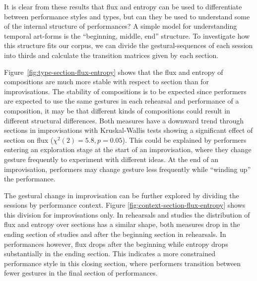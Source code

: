 \documentclass{sigchi}
\begin{document}
It is clear from these results that flux and entropy can be used to
differentiate between performance styles and types, but can they be
used to understand some of the internal structure of performances? A
simple model for understanding temporal art-forms is the ``beginning,
middle, end'' structure. To investigate how this structure fits our
corpus, we can divide the gestural-sequences of each session into
thirds and calculate the transition matrices given by each section.

Figure~\ref{fig:type-section-flux-entropy} shows that the flux and
entropy of compositions are much more stable with respect to section
than for improvisations. The stability of compositions is to be
expected since performers are expected to use the same gestures in
each rehearsal and performance of a composition, it may be that
different kinds of compositions could result in different structural
differences. Both measures have a downward trend through sections in
improvisations with Kruskal-Wallis tests showing a significant effect
of section on flux ($\chi^2(2)=5.8, p=0.05$). This could be explained
by performers entering an exploration stage at the start of an
improvisation, where they change gesture frequently to experiment with
different ideas. At the end of an improvisation, performers may change
gesture less frequently while ``winding up'' the performance.

The gestural change in improvisation can be further explored by
dividing the sessions by performance context. Figure
\ref{fig:context-section-flux-entropy} shows this division for
improvisations only. In rehearsals and studies the distribution of
flux and entropy over sections has a similar shape, both measures drop
in the ending section of studies and after the beginning section in
rehearsals. In performances however, flux drops after the beginning
while entropy drops substantially in the ending section. This
indicates a more constrained performance style in this closing
section, where performers transition between fewer gestures in the
final section of performances.


\end{document}
